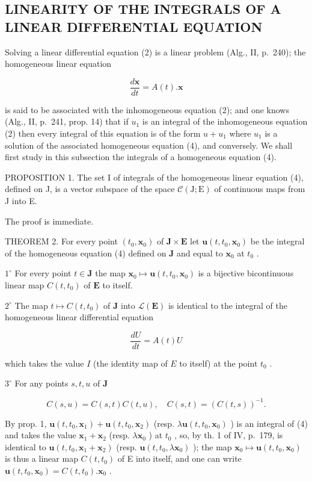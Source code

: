\subsection{LINEARITY OF THE INTEGRALS OF A LINEAR DIFFERENTIAL EQUATION}

Solving a linear differential equation (2) is a linear problem (Alg., II, p.~240); the homogeneous linear equation

\[
{\frac {d \mathbf {x}}{d t}} = A (t). \mathbf {x}\tag{4}
\]

is said to be associated with the inhomogeneous equation (2); and one knows (Alg., II, p.~241, prop. 14) that if \(u_{1}\) is an integral of the inhomogeneous equation (2) then every integral of this equation is of the form \(u + u_{1}\) where \(u_{1}\) is a solution of the associated homogeneous equation (4), and conversely. We shall first study in this subsection the integrals of a homogeneous equation (4).

PROPOSITION 1. The set I of integrals of the homogeneous linear equation (4), defined on J, is a vector subspace of the space \(\mathcal{C}(\mathrm{J};\mathrm{E})\) of continuous maps from J into E.

The proof is immediate.

THEOREM 2. For every point \((t_0, \mathbf{x}_0)\) of \(\mathbf{J} \times \mathbf{E}\) let \(\mathbf{u}(t, t_0, \mathbf{x}_0)\) be the integral of the homogeneous equation (4) defined on \(\mathbf{J}\) and equal to \(\mathbf{x}_0\) at \(t_0\) .

\(1^{\circ}\) For every point \(t \in \mathbf{J}\) the map \(\mathbf{x}_0 \mapsto \mathbf{u}(t, t_0, \mathbf{x}_0)\) is a bijective bicontinuous linear map \(C(t, t_0)\) of \(\mathbf{E}\) to itself.

\(2^{\circ}\) The map \(t \mapsto C(t, t_0)\) of \(\mathbf{J}\) into \(\mathcal{L}(\mathbf{E})\) is identical to the integral of the homogeneous linear differential equation

\[
\frac {d U}{d t} = A (t) U\tag{5}
\]

which takes the value \(I\) (the identity map of \(E\) to itself) at the point \(t_0\) .

\(3^{\circ}\) For any points \(s, t, u\) of \(\mathbf{J}\)

\[
C (s, u) = C (s, t) C (t, u), \quad C (s, t) = (C (t, s)) ^ {- 1}.\tag{6}
\]

By prop. 1, \(\mathbf{u}(t,t_0,\mathbf{x}_1) + \mathbf{u}(t,t_0,\mathbf{x}_2)\) (resp. \(\lambda \mathbf{u}(t,t_0,\mathbf{x}_0)\) ) is an integral of (4) and takes the value \(\mathbf{x}_1 + \mathbf{x}_2\) (resp. \(\lambda \mathbf{x}_0\) ) at \(t_0\) , so, by th. 1 of IV, p.~179, is identical to \(\mathbf{u}(t,t_0,\mathbf{x}_1 + \mathbf{x}_2)\) (resp. \(\mathbf{u}(t,t_0,\lambda \mathbf{x}_0)\) ); the map \(\mathbf{x}_0\mapsto \mathbf{u}(t,t_0,\mathbf{x}_0)\) is thus a linear map \(C(t,t_0)\) of E into itself, and one can write \(\mathbf{u}(t,t_0,\mathbf{x}_0) = C(t,t_0).\mathbf{x}_0\) .

